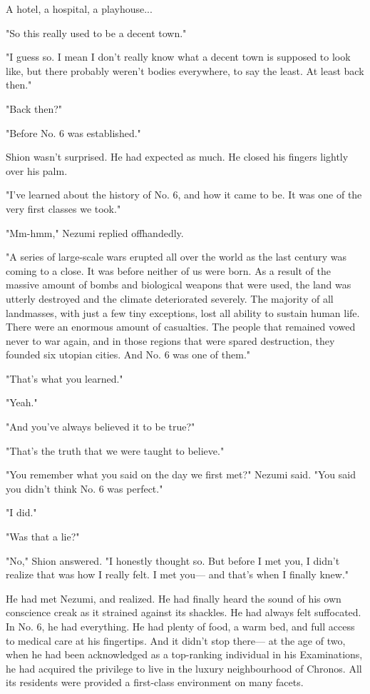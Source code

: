 A hotel, a hospital, a playhouse...

"So this really used to be a decent town."

"I guess so. I mean I don't really know what a decent town is supposed
to look like, but there probably weren't bodies everywhere, to say the
least. At least back then."

"Back then?"

"Before No. 6 was established."

Shion wasn't surprised. He had expected as much. He closed his fingers
lightly over his palm.

"I've learned about the history of No. 6, and how it came to be. It was
one of the very first classes we took."

"Mm-hmm," Nezumi replied offhandedly.

"A series of large-scale wars erupted all over the world as the last
century was coming to a close. It was before neither of us were born. As
a result of the massive amount of bombs and biological weapons that were
used, the land was utterly destroyed and the climate deteriorated
severely. The majority of all landmasses, with just a few tiny
exceptions, lost all ability to sustain human life. There were an
enormous amount of casualties. The people that remained vowed never to
war again, and in those regions that were spared destruction, they
founded six utopian cities. And No. 6 was one of them."

"That's what you learned."

"Yeah."

"And you've always believed it to be true?"

"That's the truth that we were taught to believe."

"You remember what you said on the day we first met?" Nezumi said. "You
said you didn't think No. 6 was perfect."

"I did."

"Was that a lie?"

"No," Shion answered. "I honestly thought so. But before I met you, I
didn't realize that was how I really felt. I met you--- and that's when I
finally knew."

He had met Nezumi, and realized. He had finally heard the sound of his
own conscience creak as it strained against its shackles. He had always
felt suffocated. In No. 6, he had everything. He had plenty of food, a
warm bed, and full access to medical care at his fingertips. And it
didn't stop there--- at the age of two, when he had been acknowledged as a
top-ranking individual in his Examinations, he had acquired the
privilege to live in the luxury neighbourhood of Chronos. All its
residents were provided a first-class environment on many facets.


